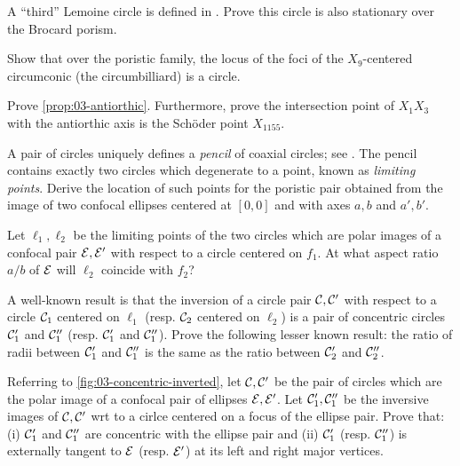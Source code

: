 \begin{exercise}
A ``third'' Lemoine circle  is defined in \cite{darij2012-ehrmann}. Prove this circle is also stationary over the Brocard porism. 
\end{exercise}

\begin{exercise}
Show that over the poristic family, the locus of the foci of the $X_9$-centered circumconic (the circumbilliard) is a circle.
\end{exercise}

\begin{exercise}
Prove \cref{prop:03-antiorthic}. Furthermore, prove the intersection point of $X_1 X_3$ with the antiorthic axis is the Schöder point $X_{1155}$.
\end{exercise}

\begin{exercise}
A pair of circles uniquely defines a {\em pencil} of coaxial circles; see \cite[Limiting Points]{mw}. The pencil contains exactly two circles which degenerate to a point, known as {\em limiting points}. Derive the location of such points for the poristic pair obtained from the image of two confocal ellipses centered at $[0,0]$ and with axes $a,b$ and $a',b'$.
\end{exercise}

\begin{exercise}
Let $\ell_1,\ell_2$ be the limiting points of the two circles which are polar images of a confocal pair $\mathcal{E},\mathcal{E}'$ with respect to a circle centered on $f_1$. At what aspect ratio $a/b$ of $\mathcal{E}$ will $\ell_2$ coincide with $f_2$?
\end{exercise}

\begin{exercise}
A well-known result is that the inversion of a circle pair $\mathcal{C},\mathcal{C}'$ with respect to a circle $\mathcal{C}_1$ centered on $\ell_1$ (resp. $\mathcal{C}_2$ centered on $\ell_2$) is a pair of concentric circles $\mathcal{C}_1'$ and $\mathcal{C}_1''$ (resp. $\mathcal{C}_1'$ and $\mathcal{C}_1''$). Prove the following lesser known result: the ratio of radii between $\mathcal{C}_1'$ and $\mathcal{C}_1''$ is the same as the ratio between $\mathcal{C}_2'$ and $\mathcal{C}_2''$. 
\end{exercise}

\begin{exercise}
Referring to \cref{fig:03-concentric-inverted}, let $\mathcal{C},\mathcal{C}'$ be the pair of circles which are the polar image of a confocal pair of ellipses $\mathcal{E},\mathcal{E}'$. Let $\mathcal{C}_1', \mathcal{C}_1''$ be the inversive images of $\mathcal{C},\mathcal{C}'$ wrt to a cirlce centered on a focus of the ellipse pair. Prove that: (i) $\mathcal{C}_1'$ and $\mathcal{C}_1''$ are concentric with the ellipse pair and (ii) $\mathcal{C}_1'$ (resp. $\mathcal{C}_1''$) is externally tangent to $\mathcal{E}$ (resp. $\mathcal{E}'$) at its left and right major vertices.
\end{exercise}

